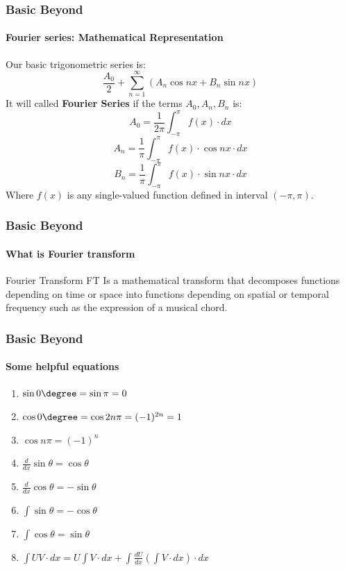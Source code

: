 \documentclass[9 pt]{beamer}
\begin{document}
\begin{frame}
	\frametitle{Basic Beyond}
	\framesubtitle{Fourier series: Mathematical Representation}
	Our basic trigonometric series is:
	$$\frac{A_0}{2} + \sum_{n=1}^{\infty} (A_n\cos nx + B_n\sin nx)$$
	It will called \textbf{Fourier Series} if the terms $A_0, A_n, B_n$ is:
	$$A_0 = \frac{1}{2\pi}\int_{-\pi}^{\pi} f(x)\cdot dx$$
	$$A_n = \frac{1}{\pi}\int_{-\pi}^{\pi} f(x)\cdot \cos nx\cdot dx$$
	$$B_n = \frac{1}{\pi}\int_{-\pi}^{\pi} f(x)\cdot \sin nx\cdot dx$$
	Where \textbf{$f(x)$} is any single-valued function defined in interval $(-\pi, \pi)$.
	\transfade[duration=0.6]
\end{frame}


\begin{frame}
	\frametitle{Basic Beyond}
	\framesubtitle{What is Fourier transform}
	\begin{block}{Fourier Transform}
		FT Is a mathematical transform that decomposes functions depending on time or space into functions depending on spatial or temporal frequency such as the expression of a musical chord.
	\end{block}
	\transwipe[duration=0.6]
\end{frame}


\begin{frame}
	\frametitle{Basic Beyond}
	\framesubtitle{Some helpful equations}
	\begin{enumerate}

		\item<+-| alert@+> $\sin 0\degree = \sin \pi = 0$
		\item<+-| alert@+> $\cos 0\degree = \cos 2n\pi = (-1)^{2n} = 1$
		\item<+-| alert@+> $\cos n\pi = (-1)^n$
		\item<+-| alert@+> $\frac{d}{dx} \sin\theta = \cos\theta$
		\item<+-| alert@+> $\frac{d}{dx} \cos\theta = -\sin\theta$
		\item<+-| alert@+> $\int \sin\theta = -\cos\theta$
		\item<+-| alert@+> $\int \cos\theta = \sin\theta$
		\item<+-| alert@+> $\int UV\cdot dx=U\int V\cdot dx+\int \frac{dU}{dx}(\int V\cdot dx)\cdot dx$

			\transfade[duration=0.15]
	\end{enumerate}
\end{frame}
\end{document}
